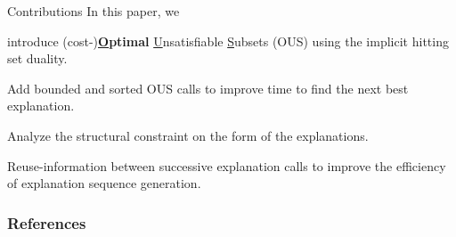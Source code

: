 \documentclass{beamer}
\begin{document}
	\begin{frame}{Contributions}
		In this paper, we
			\begin{description}[font=\color{vuborange}\itshape]
			\item[Optimality] introduce (cost-)\textbf{\underline{O}ptimal} \underline{U}nsatisfiable \underline{S}ubsets (OUS) using the implicit hitting set duality.
			\item[Efficiency] Add bounded and sorted OUS calls to improve time to find the next best explanation.
			\item[Constrainedness] Analyze the structural constraint on the form of the explanations.
			\item[Incrementality] Reuse-information between successive explanation calls to improve the efficiency of explanation sequence generation.
		\end{description}
		\vfill
	\end{frame}
	
	\begin{frame}[allowframebreaks]
		\frametitle{References}
		
		
	\end{frame}
\end{document}
